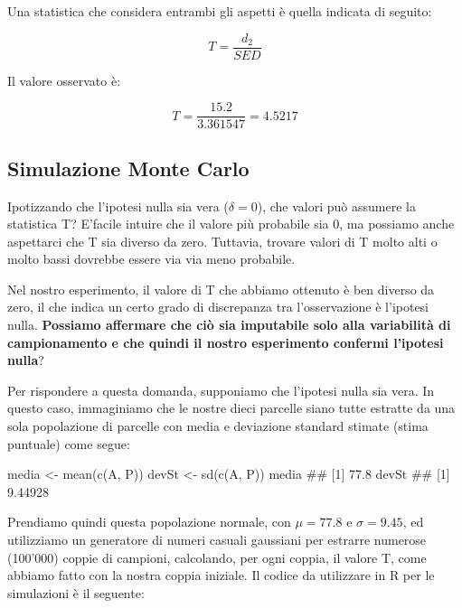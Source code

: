 \documentclass[a4paper,12pt,oneside]{book}
\newenvironment{Shaded}{\begin{snugshade}}{\end{snugshade}}
\newcommand{\DocumentationTok}[1]{#1}
\newcommand{\OtherTok}[1]{#1}
\newcommand{\FunctionTok}[1]{#1}
\newcommand{\NormalTok}[1]{#1}
\begin{document}
Una statistica che considera entrambi gli aspetti è quella indicata di seguito:

\[T = \frac{d_2}{SED}\]

Il valore osservato è:

\[T = \frac{15.2}{3.361547} = 4.5217\]

\hypertarget{simulazione-monte-carlo}{%
\subsection{Simulazione Monte Carlo}\label{simulazione-monte-carlo}}

Ipotizzando che l'ipotesi nulla sia vera (\(\delta = 0\)), che valori può assumere la statistica T? E'facile intuire che il valore più probabile sia 0, ma possiamo anche aspettarci che T sia diverso da zero. Tuttavia, trovare valori di T molto alti o molto bassi dovrebbe essere via via meno probabile.

Nel nostro esperimento, il valore di T che abbiamo ottenuto è ben diverso da zero, il che indica un certo grado di discrepanza tra l'osservazione è l'ipotesi nulla. \textbf{Possiamo affermare che ciò sia imputabile solo alla variabilità di campionamento e che quindi il nostro esperimento confermi l'ipotesi nulla}?

Per rispondere a questa domanda, supponiamo che l'ipotesi nulla sia vera. In questo caso, immaginiamo che le nostre dieci parcelle siano tutte estratte da una sola popolazione di parcelle con media e deviazione standard stimate (stima puntuale) come segue:

\begin{Shaded}
\begin{Highlighting}[]
\NormalTok{media }\OtherTok{\textless{}{-}} \FunctionTok{mean}\NormalTok{(}\FunctionTok{c}\NormalTok{(A, P))}
\NormalTok{devSt }\OtherTok{\textless{}{-}} \FunctionTok{sd}\NormalTok{(}\FunctionTok{c}\NormalTok{(A, P))}
\NormalTok{media}
\DocumentationTok{\#\# [1] 77.8}
\NormalTok{devSt}
\DocumentationTok{\#\# [1] 9.44928}
\end{Highlighting}
\end{Shaded}

Prendiamo quindi questa popolazione normale, con \(\mu = 77.8\) e \(\sigma = 9.45\), ed utilizziamo un generatore di numeri casuali gaussiani per estrarre numerose (100'000) coppie di campioni, calcolando, per ogni coppia, il valore T, come abbiamo fatto con la nostra coppia iniziale. Il codice da utilizzare in R per le simulazioni è il seguente:
\end{document}
